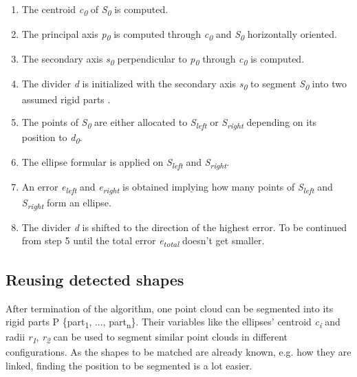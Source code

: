 \begin{enumerate}
	\item The centroid \textit{c\textsubscript{0}}  of \textit{S\textsubscript{0}} is computed.
	
	\item The principal axis \textit{p\textsubscript{0}} is computed through \textit{c\textsubscript{0}} and \textit{S\textsubscript{0}} horizontally oriented. 
	
	\item The secondary axis \textit{s\textsubscript{0}}  perpendicular to \textit{p\textsubscript{0}} through \textit{c\textsubscript{0}} is computed.
	
	\item The divider \textit{d} is initialized with the secondary axis \textit{s\textsubscript{0}} to segment \textit{S\textsubscript{0}} into two assumed rigid parts .
	
	\item The points of \textit{S\textsubscript{0}} are either allocated to \textit{S\textsubscript{left}} or \textit{S\textsubscript{right}} depending on its position to \textit{d\textsubscript{0}}.
	
	\item The ellipse formular is applied on \textit{S\textsubscript{left}} and \textit{S\textsubscript{right}}.
	
	\item An error \textit{e\textsubscript{left}} and \textit{e\textsubscript{right}} is obtained implying how many points of \textit{S\textsubscript{left}} and \textit{S\textsubscript{right}} form an ellipse. 
	
	\item The divider \textit{d} is shifted to the direction of the highest error. To be continued from step 5 until the total error \textit{e\textsubscript{total}} doesn't get smaller. 
\end{enumerate}

\subsection{Reusing detected shapes}

After termination of the algorithm, one point cloud can be segmented into its rigid parts P \{part\textsubscript{1}, ..., part\textsubscript{n}\}. Their variables like the ellipses' centroid \textit{c\textsubscript{i}} and radii \textit{r\textsubscript{1}}, \textit{r\textsubscript{2}} can be used to segment similar point clouds in different configurations. As the shapes to be matched are already known, e.g. how they are linked, finding the position to be segmented is a lot easier.

